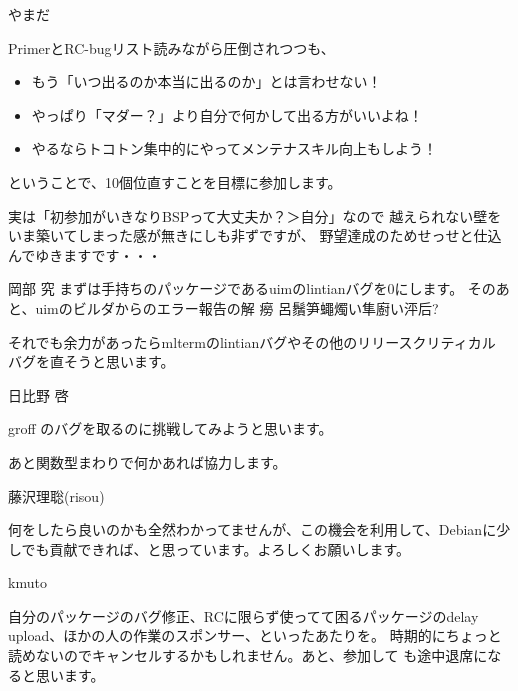 \begin{prework}{やまだ}

PrimerとRC-bugリスト読みながら圧倒されつつも、

\begin{itemize}
\item もう「いつ出るのか本当に出るのか」とは言わせない！
\item やっぱり「マダー？」より自分で何かして出る方がいいよね！
\item やるならトコトン集中的にやってメンテナスキル向上もしよう！
\end{itemize}

ということで、10個位直すことを目標に参加します。

実は「初参加がいきなりBSPって大丈夫か？＞自分」なので
越えられない壁をいま築いてしまった感が無きにしも非ずですが、
野望達成のためせっせと仕込んでゆきますです・・・

\end{prework}

\begin{prework}{岡部 究}
まずは手持ちのパッケージであるuimのlintianバグを0にします。
そのあと、uimのビルダからのエラー報告の解 癆 呂鬚笋蠅燭い隼廚い泙后?

それでも余力があったらmltermのlintianバグやその他のリリースクリティカル
バグを直そうと思います。
\end{prework}

\begin{prework}{ 日比野 啓 }

groff のバグを取るのに挑戦してみようと思います。

あと関数型まわりで何かあれば協力します。

\end{prework}



\begin{prework}{ 藤沢理聡(risou) }

何をしたら良いのかも全然わかってませんが、この機会を利用して、Debianに少
 しでも貢献できれば、と思っています。よろしくお願いします。

\end{prework}



\begin{prework}{ kmuto }

自分のパッケージのバグ修正、RCに限らず使ってて困るパッケージのdelay
 upload、ほかの人の作業のスポンサー、といったあたりを。
時期的にちょっと読めないのでキャンセルするかもしれません。あと、参加して
 も途中退席になると思います。


\end{prework}



